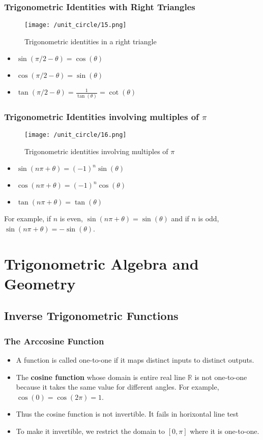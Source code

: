 \begin{frame}
    \frametitle{Trigonometric Identities with Right Triangles}
    \begin{figure}
        \centering
        \texttt{[image: /unit\_circle/15.png]}
        \caption{Trigonometric identities in a right triangle}
    \end{figure}

    \begin{itemize}
        \item  \(\sin(\pi/2 - \theta) = \cos(\theta)\)
        \item \(\cos(\pi/2 - \theta) = \sin(\theta)\)
        \item \(\tan(\pi/2 - \theta) = \frac{1}{\tan(\theta)} = \cot(\theta)\)
    \end{itemize}
\end{frame}

\begin{frame}
    \frametitle{Trigonometric Identities involving multiples of \(\pi\)}
    \begin{figure}
        \centering
        \texttt{[image: /unit\_circle/16.png]}
        \caption{Trigonometric identities involving multiples of \(\pi\)}
    \end{figure}
    \begin{itemize}
        \item \(\sin(n\pi + \theta) = (-1)^n \sin(\theta)\)
        \item \(\cos(n\pi + \theta) = (-1)^n \cos(\theta)\)
        \item \(\tan(n\pi + \theta) = \tan(\theta)\)
    \end{itemize}
    For example, if \(n\) is even, \(\sin(n\pi + \theta) = \sin(\theta)\) and if \(n\) is odd, \(\sin(n\pi + \theta) = -\sin(\theta)\). 
\end{frame}

\section{Trigonometric Algebra and Geometry}
\subsection{Inverse Trigonometric Functions}
\begin{frame}
    \frametitle{The Arccosine Function}
    \begin{itemize}
        \item A function is called one-to-one if it maps distinct inputs to distinct outputs.
        \item The \textbf{cosine function} whose domain is entire real line \(\mathbb{R}\) is not one-to-one because it takes the same value for different angles. For example, \(\cos(0) = \cos(2\pi) = 1\).
        \item Thus the cosine function is not invertible. It fails in horixontal line test
        \item To make it invertible, we restrict the domain to \([0, \pi]\) where it is one-to-one.
    \end{itemize}
\end{frame}

